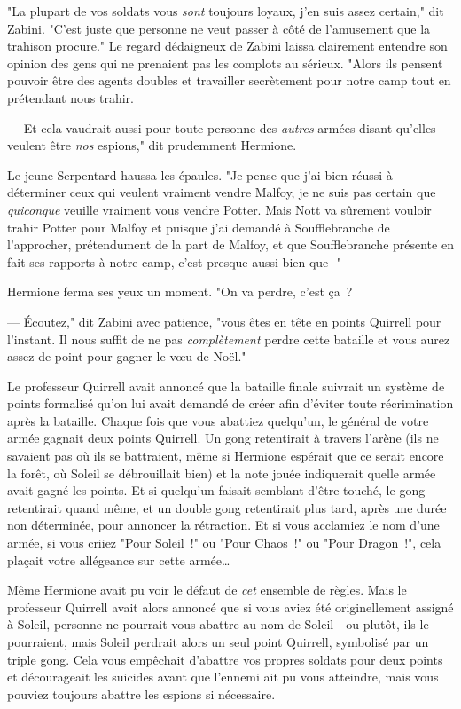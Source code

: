 "La plupart de vos soldats vous \emph{sont} toujours loyaux, j'en suis assez certain," dit Zabini. "C'est juste que personne ne veut passer à côté de l'amusement que la trahison procure." Le regard dédaigneux de Zabini laissa clairement entendre son opinion des gens qui ne prenaient pas les complots au sérieux. "Alors ils pensent pouvoir être des agents doubles et travailler secrètement pour notre camp tout en prétendant nous trahir.

--- Et cela vaudrait aussi pour toute personne des \emph{autres} armées disant qu'elles veulent être \emph{nos} espions," dit prudemment Hermione.

Le jeune Serpentard haussa les épaules. "Je pense que j'ai bien réussi à déterminer ceux qui veulent vraiment vendre Malfoy, je ne suis pas certain que \emph{quiconque} veuille vraiment vous vendre Potter. Mais Nott va sûrement vouloir trahir Potter pour Malfoy et puisque j'ai demandé à Soufflebranche de l'approcher, prétendument de la part de Malfoy, et que Soufflebranche présente en fait ses rapports à notre camp, c'est presque aussi bien que -"

Hermione ferma ses yeux un moment. "On va perdre, c'est ça~?

--- Écoutez," dit Zabini avec patience, "vous êtes en tête en points Quirrell pour l'instant. Il nous suffit de ne pas \emph{complètement} perdre cette bataille et vous aurez assez de point pour gagner le vœu de Noël."

Le professeur Quirrell avait annoncé que la bataille finale suivrait un système de points formalisé qu'on lui avait demandé de créer afin d'éviter toute récrimination après la bataille. Chaque fois que vous abattiez quelqu'un, le général de votre armée gagnait deux points Quirrell. Un gong retentirait à travers l'arène (ils ne savaient pas où ils se battraient, même si Hermione espérait que ce serait encore la forêt, où Soleil se débrouillait bien) et la note jouée indiquerait quelle armée avait gagné les points. Et si quelqu'un faisait semblant d'être touché, le gong retentirait quand même, et un double gong retentirait plus tard, après une durée non déterminée, pour annoncer la rétraction. Et si vous acclamiez le nom d'une armée, si vous criiez "Pour Soleil~!" ou "Pour Chaos~!" ou "Pour Dragon~!", cela plaçait votre allégeance sur cette armée…

Même Hermione avait pu voir le défaut de \emph{cet} ensemble de règles. Mais le professeur Quirrell avait alors annoncé que si vous aviez été originellement assigné à Soleil, personne ne pourrait vous abattre au nom de Soleil - ou plutôt, ils le pourraient, mais Soleil perdrait alors un seul point Quirrell, symbolisé par un triple gong. Cela vous empêchait d'abattre vos propres soldats pour deux points et décourageait les suicides avant que l'ennemi ait pu vous atteindre, mais vous pouviez toujours abattre les espions si nécessaire.

